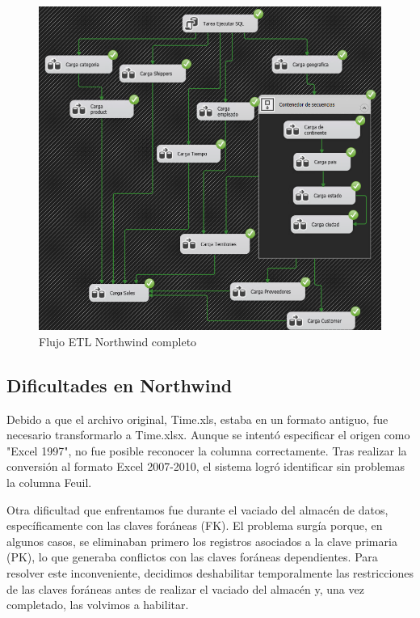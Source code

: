 \documentclass[12pt, a4paper, twoside]{article}
\begin{document}
	
	\begin{figure}[H]
		\centering
		\includegraphics[width=1\textwidth]{image/flujo_north_completo.png}
		\caption{Flujo ETL Northwind completo}
		\label{fig:8}
	\end{figure}
	

	
	\subsection{Dificultades en Northwind}
	
	Debido a que el archivo original, Time.xls, estaba en un formato antiguo, fue necesario transformarlo a Time.xlsx. Aunque se intentó especificar el origen como "Excel 1997", no fue posible reconocer la columna correctamente. Tras realizar la conversión al formato Excel 2007-2010, el sistema logró identificar sin problemas la columna Feuil.
	
	Otra dificultad que enfrentamos fue durante el vaciado del almacén de datos, específicamente con las claves foráneas (FK). El problema surgía porque, en algunos casos, se eliminaban primero los registros asociados a la clave primaria (PK), lo que generaba conflictos con las claves foráneas dependientes. Para resolver este inconveniente, decidimos deshabilitar temporalmente las restricciones de las claves foráneas antes de realizar el vaciado del almacén y, una vez completado, las volvimos a habilitar.
	
\end{document}
